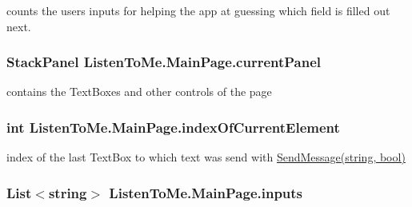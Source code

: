 counts the user\textquotesingle{}s inputs for helping the app at guessing which field is filled out next. 

\subsubsection[{\texorpdfstring{current\+Panel}{currentPanel}}]{\setlength{\rightskip}{0pt plus 5cm}Stack\+Panel Listen\+To\+Me.\+Main\+Page.\+current\+Panel\hspace{0.3cm}{\ttfamily [private]}}\hypertarget{class_listen_to_me_1_1_main_page_a6dbd09c74d99bf0223489a06035980eb}{}\label{class_listen_to_me_1_1_main_page_a6dbd09c74d99bf0223489a06035980eb}


contains the Text\+Boxes and other controls of the page 

\subsubsection[{\texorpdfstring{index\+Of\+Current\+Element}{indexOfCurrentElement}}]{\setlength{\rightskip}{0pt plus 5cm}int Listen\+To\+Me.\+Main\+Page.\+index\+Of\+Current\+Element\hspace{0.3cm}{\ttfamily [private]}}\hypertarget{class_listen_to_me_1_1_main_page_acc0f3cb24ff26c2cfc76cd42a2fe2118}{}\label{class_listen_to_me_1_1_main_page_acc0f3cb24ff26c2cfc76cd42a2fe2118}


index of the last Text\+Box to which text was send with \hyperlink{class_listen_to_me_1_1_main_page_a09c2518852d4261ff6a2118c8e01de9f}{Send\+Message(string, bool)} 

\subsubsection[{\texorpdfstring{inputs}{inputs}}]{\setlength{\rightskip}{0pt plus 5cm}List$<$string$>$ Listen\+To\+Me.\+Main\+Page.\+inputs\hspace{0.3cm}{\ttfamily [private]}}\hypertarget{class_listen_to_me_1_1_main_page_a7ee97019c1b3318631a799c2979b7364}{}\label{class_listen_to_me_1_1_main_page_a7ee97019c1b3318631a799c2979b7364}
